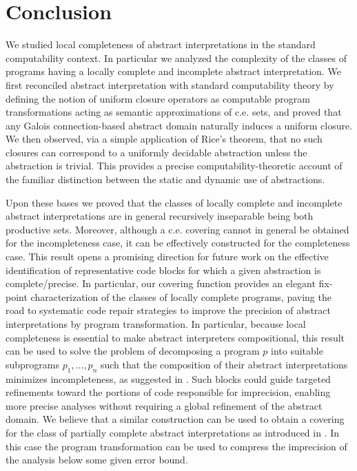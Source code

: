 \documentclass[runningheads]{llncs}
\def\re{c.e.}
\begin{document}
\section{Conclusion}

We studied local completeness of abstract interpretations in the standard computability context. In particular we analyzed the complexity of the classes of programs having a locally complete and incomplete abstract interpretation. We first reconciled abstract interpretation with standard computability theory by defining the notion of uniform closure operators as computable program transformations acting as semantic approximations of {\re} sets, and proved that any Galois connection-based abstract domain naturally induces a uniform closure. We then observed, via a simple application of Rice's theorem, that no such closures can correspond to a uniformly decidable abstraction unless the abstraction is trivial. This provides a precise computability-theoretic account of the familiar distinction between the static and dynamic use of abstractions.

Upon these bases we proved that the classes of locally complete and incomplete abstract interpretations are in general recursively inseparable being both productive sets. Moreover, although a {\re} covering cannot in general be obtained for the incompleteness case, it can be effectively constructed for the completeness case. This result opens a promising direction for future work on the effective identification of representative code blocks for which a given abstraction is complete/precise. In particular, our covering function provides an elegant fix-point characterization of the classes of locally complete programs, paving the road to systematic code repair strategies to improve the precision of abstract interpretations by program transformation. In particular, because local completeness is essential to make abstract interpreters compositional, this result can be used to solve the problem of decomposing a program $p$ into suitable subprograms $p_1,\ldots,p_n$ such that the composition of their abstract interpretations minimizes incompleteness, as suggested in \cite{GiacobazziR25}. Such blocks could guide targeted refinements toward the portions of code responsible for imprecision, enabling more precise analyses without requiring a global refinement of the abstract domain. We believe that a similar construction can be used to obtain a covering for the class of partially complete abstract interpretations as introduced in \cite{CDG22}. In this case the program transformation can be used to compress the imprecision of the analysis below some given error bound.
\end{document}
